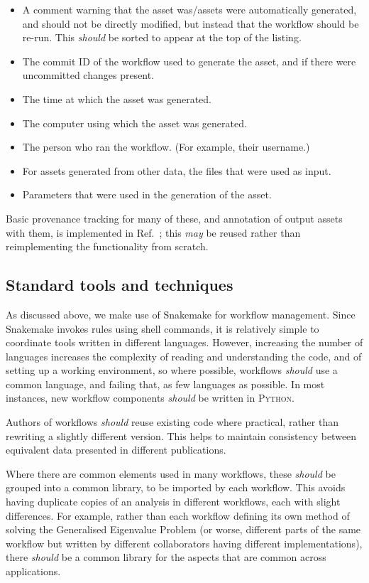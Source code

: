 \documentclass{article}
\newcommand\rfcword[1]{\emph{#1}\xspace}
\newcommand\should{\rfcword{should}}
\newcommand\may{\rfcword{may}}
\newcommand\program[1]{\textsc{#1}\xspace}
\begin{document}
\begin{itemize}
  \item
        A comment warning that the asset was/assets were automatically generated,
        and should not be directly modified,
        but instead that the workflow should be re-run.
        This \should be sorted to appear at the top of the listing.
  \item
        The commit ID of the workflow used to generate the asset,
        and if there were uncommitted changes present.
  \item
        The time at which the asset was generated.
  \item
        The computer using which the asset was generated.
  \item
        The person who ran the workflow.
        (For example, their username.)
  \item
        For assets generated from other data,
        the files that were used as input.
  \item
        Parameters that were used in the generation of the asset.
\end{itemize}

Basic provenance tracking for many of these,
and annotation of output assets with them,
is implemented in Ref.~\cite{bennett_2024_13819431};
this \may be reused rather than reimplementing the functionality from scratch.

\subsection{Standard tools and techniques}

As discussed above,
we make use of Snakemake for workflow management.
Since Snakemake invokes rules using shell commands,
it is relatively simple to coordinate tools written in different languages.
However,
increasing the number of languages increases the complexity of reading and understanding the code,
and of setting up a working environment,
so where possible,
workflows \should use a common language,
and failing that,
as few languages as possible.
In most instances,
new workflow components \should be written in \program{Python}.

Authors of workflows \should reuse existing code where practical,
rather than rewriting a slightly different version.
This helps to maintain consistency between equivalent data presented in different publications.

Where there are common elements used in many workflows,
these \should be grouped into a common library,
to be imported by each workflow.
This avoids having duplicate copies of an analysis in different workflows,
each with slight differences.
For example,
rather than each workflow defining its own method of
solving the Generalised Eigenvalue Problem
(or worse,
different parts of the same workflow but written by different collaborators
having different implementations),
there \should be a common library for the aspects that are common across applications.
\end{document}
